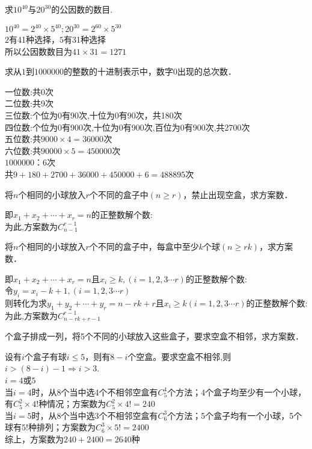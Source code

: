 \documentclass[12pt,letterpaper, onecolumn]{exam}
\begin{document}
\begin{questions}
 \question 求$10^{40}$与$20^{30}$的公因数的数目.
    \begin{solution}
        $10^{40}=2^{40}\times5^{40};20^{30}=2^{60}\times5^{30}$\\
        $2$有41种选择，$5$有31种选择\\
        所以公因数数目为$41\times31=1271$
    \end{solution}

 \question  求从$1$到$1000000$的整数的十进制表示中，数字$0$出现的总次数．
    \begin{solution}
        
        一位数:共0次\\
        二位数:共9次\\
        三位数:个位为0有90次,十位为0有90次，共180次\\
        四位数:个位为0有900次,十位为0有900次,百位为0有900次,共2700次\\
        五位数:共$9000\times4=36000$次\\
        六位数:共$90000\times5=450000$次\\
        $1000000$：6次\\
        共$9+180+2700+36000+450000+6=488895$次
    \end{solution}

 \question   将$n$个相同的小球放入$r$个不同的盒子中$(n\geq r)$，禁止出现空盒，求方案数．
    \begin{solution}
        即$x_1+x_2+\cdots+x_r=n$的正整数解个数:\\
        为此,方案数为$C_{n-1}^{r-1}$
    \end{solution}


 \question   将$n$个相同的小球放入$r$个不同的盒子中，每盒中至少$k$个球$(n\geq rk)$，求方案数．
    \begin{solution}
        即$x_1+x_2+\cdots+x_r=n$且$x_i\geq k,(i=1,2,3\cdots r)$的正整数解个数:\\
        令$y_i=x_i-k+1,(i=1,2,3\cdots r)$\\
        则转化为求$y_1+y_2+\cdots+y_r=n-rk+r$且$x_i\geq k(i=1,2,3\cdots r)$的正整数解个数:\\
        为此,方案数为$C_{n-rk+r-1}^{r-1}$
    \end{solution}

  个盒子排成一列，将5个不同的小球放入这些盒子，要求空盒不相邻，求方案数．
    \begin{solution}
        设有$i$个盒子有球$i\leq 5$，则有$8-i$个空盒。要求空盒不相邻,则$i > (8-i)-1\Rightarrow i> 3$.\\
        $i=4$或$5$\\
        当$i=4$时，从8个当中选4个不相邻空盒有$C_5^4$个方法；4个盒子均至少有一个小球，有$C_5^2 \times 4!$种情况；方案数为$C_5^2 \times 4!=240$\\
        当$i=5$时，从8个当中选3个不相邻空盒有$C_6^3$个方法；5个盒子均有一个小球，5个球有$5!$种排列；方案数为$C_6^3 \times 5!=2400$\\
        综上，方案数为$240+2400=2640$种
    \end{solution}


\end{questions}
\end{document}
